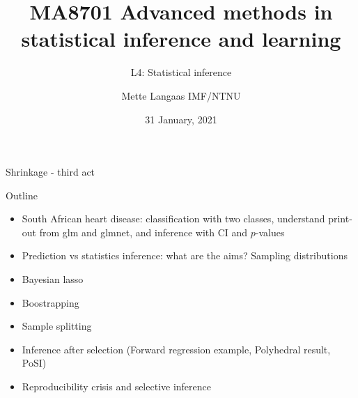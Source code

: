 \documentclass[
  ignorenonframetext,
]{beamer}
\title{MA8701 Advanced methods in statistical inference and learning}
\subtitle{L4: Statistical inference}
\author{Mette Langaas IMF/NTNU}
\date{31 January, 2021}
\providecommand{\tightlist}{%
  \setlength{\itemsep}{0pt}\setlength{\parskip}{0pt}}
\begin{document}
\frame{\titlepage}

\begin{frame}{Shrinkage - third act}
\protect\hypertarget{shrinkage---third-act}{}

\begin{block}{Outline}

\begin{itemize}
\tightlist
\item
  South African heart disease: classification with two classes,
  understand print-out from glm and glmnet, and inference with CI and
  \(p\)-values
\item
  Prediction vs statistics inference: what are the aims? Sampling
  distributions
\item
  Bayesian lasso
\item
  Boostrapping
\item
  Sample splitting
\item
  Inference after selection (Forward regression example, Polyhedral
  result, PoSI)
\item
  Reproducibility crisis and selective inference
\end{itemize}

\end{block}

\end{frame}
\end{document}
